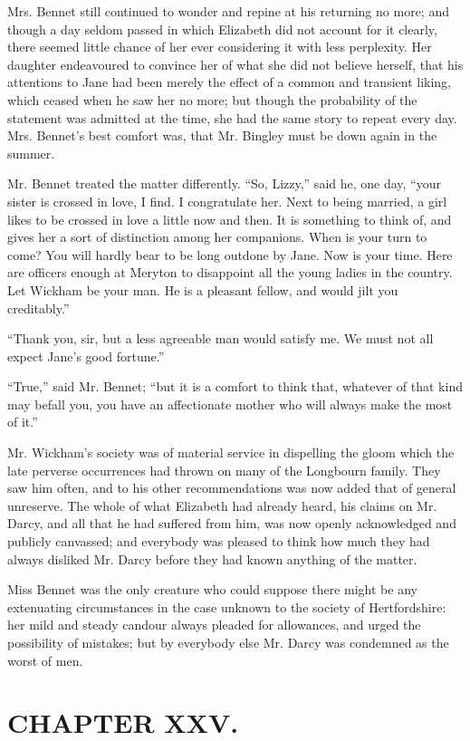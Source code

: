 Mrs. Bennet still continued to wonder and repine at his returning no more; and though a day seldom passed in which Elizabeth did not account for it clearly, there seemed little chance of her ever considering it with less perplexity. Her daughter endeavoured to convince her of what she did not believe herself, that his attentions to Jane had been merely the effect of a common and transient liking, which ceased when he saw her no more; but though the probability of the statement was admitted at the time, she had the same story to repeat every day. Mrs. Bennet's best comfort was, that Mr. Bingley must be down again in the summer.

Mr. Bennet treated the matter differently. ``So, Lizzy,'' said he, one day, ``your sister is crossed in love, I find. I congratulate her. Next to being married, a girl likes to be crossed in love a little now and then. It is something to think of, and gives her a sort of distinction among her companions. When is your turn to come? You will hardly bear to be long outdone by Jane. Now is your time. Here are officers enough at Meryton to disappoint all the young ladies in the country. Let Wickham be your man. He is a pleasant fellow, and would jilt you creditably.''

``Thank you, sir, but a less agreeable man would satisfy me. We must not all expect Jane's good fortune.''

``True,'' said Mr. Bennet; ``but it is a comfort to think that, whatever of that kind may befall you, you have an affectionate mother who will always make the most of it.''

Mr. Wickham's society was of material service in dispelling the gloom which the late perverse occurrences had thrown on many of the Longbourn family. They saw him often, and to his other recommendations was now added that of general unreserve. The whole of what Elizabeth had already heard, his claims on Mr. Darcy, and all that he had suffered from him, was now openly acknowledged and publicly canvassed; and everybody was pleased to think how much they had always disliked Mr. Darcy before they had known anything of the matter.

Miss Bennet was the only creature who could suppose there might be any extenuating circumstances in the case unknown to the society of Hertfordshire: her mild and steady candour always pleaded for allowances, and urged the possibility of mistakes; but by everybody else Mr. Darcy was condemned as the worst of men.

\chapter{CHAPTER XXV.}

